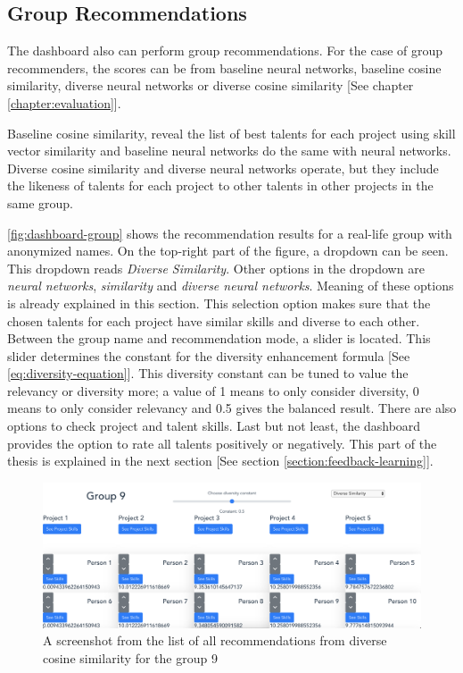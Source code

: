 \subsection{Group Recommendations}

The dashboard also can perform group recommendations. For the case of group recommenders, the scores can be from baseline neural networks, baseline cosine similarity, diverse neural networks or diverse cosine similarity [See chapter \ref{chapter:evaluation}].

Baseline cosine similarity, reveal the list of best talents for each project using skill vector similarity and baseline neural networks do the same with neural networks. Diverse cosine similarity and diverse neural networks operate, but they include the likeness of talents for each project to other talents in other projects in the same group.


\autoref{fig:dashboard-group} shows the recommendation results for a real-life group with anonymized names. On the top-right part of the figure, a dropdown can be seen. This dropdown reads \textit{Diverse Similarity}. Other options in the dropdown are \textit{neural networks}, \textit{similarity} and \textit{diverse neural networks}. Meaning of these options is already explained in this section. This selection option makes sure that the chosen talents for each project have similar skills and diverse to each other. Between the group name and recommendation mode, a slider is located. This slider determines the constant for the diversity enhancement formula [See \ref{eq:diversity-equation}]. This diversity constant can be tuned to value the relevancy or diversity more; a value of 1 means to only consider diversity, 0 means to only consider relevancy and 0.5 gives the balanced result. There are also options to check project and talent skills. Last but not least, the dashboard provides the option to rate all talents positively or negatively. This part of the thesis is explained in the next section [See section \ref{section:feedback-learning}].

 \begin{figure}[htp]
	\centering
	\includegraphics[width=\textwidth]{figures/DashboardGroup.png}
	\caption{A screenshot from the list of all recommendations from diverse cosine similarity for the group 9}
	\label{fig:dashboard-group}
\end{figure}




